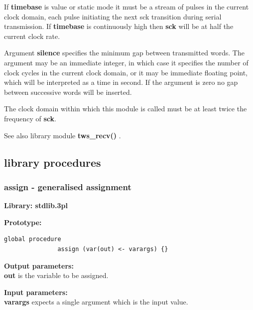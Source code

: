             If {\bf timebase} is value or static mode it must be a stream
            of pulses in the current clock domain, each pulse initiating
            the next sck transition during serial transmission. If
            {\bf timebase} is continuously high then {\bf sck} will be at
            half the current clock rate.
            
            Argument {\bf silence} specifies the minimum gap between transmitted
            words. The argument may be an immediate integer, in which case it
            specifies the number of clock cycles in the current clock domain, or
            it may be immediate floating point, which will be interpreted as a
            time in second. If the argument is zero no gap between successive words
            will be inserted.
            
            The clock domain within which this module is called must be
            at least twice the frequency of {\bf sck}.

            See also library module {\bf tws\_recv()} .


    \subsection{library procedures}
            





        \subsubsection{assign - generalised assignment}\label{sec:lpassign}

            {\bf Library: stdlib.3pl}

            {\bf Prototype:} \\
            \vsp
            \begin{lstlisting}[gobble=12, language=threepl]
               global procedure
               assign (var(out) <- varargs) {}
            \end{lstlisting}

            {\bf Output parameters:} \\
            {\bf out} is the variable to be assigned.

            {\bf Input parameters:} \\            
            {\bf varargs} expects a single argument which is the input value.
        
